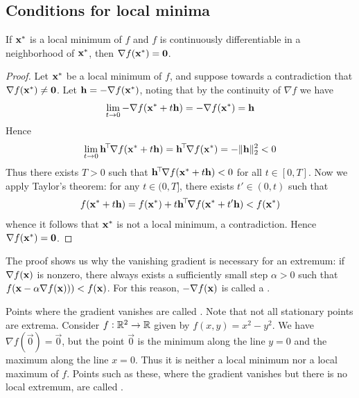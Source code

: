 \subsection{Conditions for local minima}
\begin{proposition}
If $\mathbf{x}^*$ is a local minimum of $f$ and $f$ is continuously differentiable in a neighborhood of $\mathbf{x}^*$, then $\nabla f(\mathbf{x}^*) = \mathbf{0}$.
\end{proposition}
\begin{proof}
Let $\mathbf{x}^*$ be a local minimum of $f$, and suppose towards a contradiction that $\nabla f(\mathbf{x}^*) \neq \mathbf{0}$.
Let $\mathbf{h} = -\nabla f(\mathbf{x}^*)$, noting that by the continuity of $\nabla f$ we have
\[\lim_{t \to 0} -\nabla f(\mathbf{x}^* + t\mathbf{h}) = -\nabla f(\mathbf{x}^*) = \mathbf{h}\]
Hence
\[\lim_{t \to 0} \mathbf{h}^{\!\top\!}\nabla f(\mathbf{x}^* + t\mathbf{h}) = \mathbf{h}^{\!\top\!}\nabla f(\mathbf{x}^*) = -\|\mathbf{h}\|_2^2 < 0\]
Thus there exists $T > 0$ such that $\mathbf{h}^{\!\top\!}\nabla f(\mathbf{x}^* + t\mathbf{h}) < 0$ for all $t \in [0,T]$.
Now we apply Taylor's theorem: for any $t \in (0,T]$, there exists $t' \in (0,t)$ such that
\[f(\mathbf{x}^* + t\mathbf{h}) = f(\mathbf{x}^*) + t\mathbf{h}^{\!\top\!} \nabla f(\mathbf{x}^* + t'\mathbf{h}) < f(\mathbf{x}^*)\]
whence it follows that $\mathbf{x}^*$ is not a local minimum, a contradiction.
Hence $\nabla f(\mathbf{x}^*) = \mathbf{0}$.
\end{proof}
The proof shows us why the vanishing gradient is necessary for an extremum: if $\nabla f(\mathbf{x})$ is nonzero, there always exists a sufficiently small step $\alpha > 0$ such that $f(\mathbf{x} - \alpha\nabla f(\mathbf{x}))) < f(\mathbf{x})$.
For this reason, $-\nabla f(\mathbf{x})$ is called a .

Points where the gradient vanishes are called .
Note that not all stationary points are extrema.
Consider $f : \mathbb{R}^2 \to \mathbb{R}$ given by $f(x,y) = x^2 - y^2$.
We have $\nabla f(\vec{0}) = \vec{0}$, but the point $\vec{0}$ is the minimum along the line $y = 0$ and the maximum along the line $x = 0$.
Thus it is neither a local minimum nor a local maximum of $f$.
Points such as these, where the gradient vanishes but there is no local extremum, are called .

